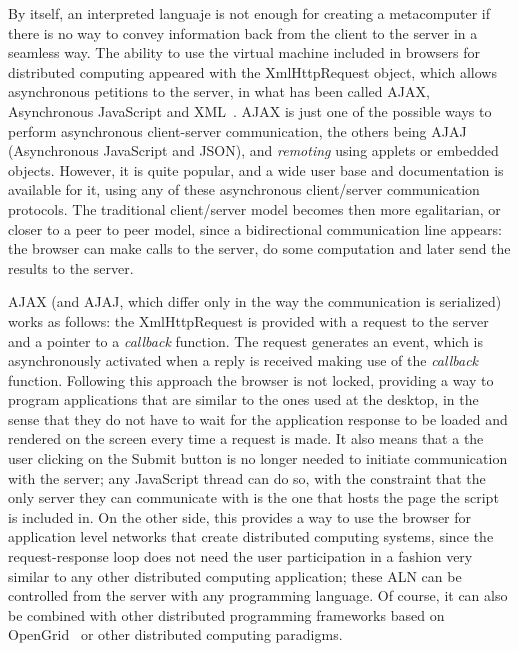 \documentclass{llncs}
\begin{document}
By itself, an interpreted languaje is not enough for creating a
metacomputer if there is no way to convey information back from the
client to the server in a seamless way. The ability to use the virtual
machine included in browsers for distributed computing appeared with
the {\sf XmlHttpRequest} object, which allows asynchronous petitions to the
server, in what has been called AJAX, Asynchronous JavaScript and
XML~\cite{wiki:AJAX}. AJAX is just one of the possible ways to
perform asynchronous client-server communication, the others being
AJAJ (Asynchronous JavaScript and JSON), and {\em remoting} using
applets or embedded objects. However, it is quite popular, and a wide
user base and documentation is available for it, using any of these
asynchronous client/server communication protocols. The traditional client/server model becomes then
more egalitarian, or closer to a peer to peer model, since a
bidirectional communication line appears: the browser can make calls to the
server, do some computation and later send the results to the server.

AJAX (and AJAJ, which differ only in the way the communication is
serialized) works as follows: the {\sf XmlHttpRequest} is provided 
with a request to the server and a pointer to a {\em callback} function. 
The request generates an event, which is asynchronously activated when a
reply is received  making use of the
 {\em callback} function. 
Following this approach the browser is not locked, providing a way to
program applications that are similar to  the ones used at the
desktop, in the sense that they do not have to wait for the
application response to be loaded
and rendered on the screen every time a request is made. It also means
that a the user clicking on the {\sf Submit} button is no longer
needed to initiate communication with the server; any JavaScript
thread can do so, with the constraint that the only server they can
communicate with is the one that hosts the page the script is included
in. On the other side, this provides a way to use the browser for application
level networks that create distributed computing systems,
since the request-response loop does not need the user participation in a
fashion very similar  to any other distributed computing application;
these ALN can be controlled from the server with any programming
language. Of course, it can also be combined with other distributed
programming frameworks based on OpenGrid~\cite{ogsa} or other
distributed computing paradigms. %
\end{document}
